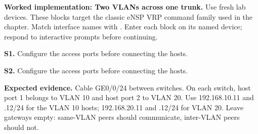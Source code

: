 


\noindent\textbf{Worked implementation: Two VLANs across one trunk.}
Use fresh lab devices. These blocks target the classic eNSP VRP command family used in the chapter. Match interface names with . Enter each block on its named device; respond to interactive prompts before continuing.

\noindent\textbf{S1.} Configure the access ports before connecting the hosts.


\noindent\textbf{S2.} Configure the access ports before connecting the hosts.


\textbf{Expected evidence.} Cable GE0/0/24 between switches. On each switch, host port 1 belongs to VLAN 10 and host port 2 to VLAN 20. Use 192.168.10.11 and .12/24 for the VLAN 10 hosts; 192.168.20.11 and .12/24 for VLAN 20. Leave gateways empty: same-VLAN peers should communicate, inter-VLAN peers should not.





